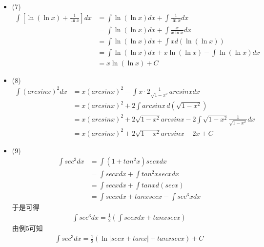 \documentclass{article}
\begin{document}
\begin{itemize}
  \item (7)
        \begin{align*}
          \int \left[ \ln(\ln x) + \frac{1}{\ln x} \right] dx
           & = \int \ln(\ln x) dx + \int \frac{1}{\ln x} dx           \\
           & = \int \ln(\ln x) dx + \int \frac{x}{x \ln x} dx         \\
           & = \int \ln(\ln x) dx + \int x d(\ln(\ln x))              \\
           & = \int \ln(\ln x) dx + x \ln(\ln x) - \int \ln(\ln x) dx \\
           & = x \ln(\ln x) + C
        \end{align*}

  \item (8)
        \begin{align*}
          \int (arcsin x)^2 dx
           & = x (arcsin x)^2 - \int x \cdot 2 \frac{1}{\sqrt{1 - x^2}} arcsin x dx                           \\
           & = x (arcsin x)^2 + 2 \int arcsin x \, d(\sqrt{1 - x^2})                                          \\
           & = x (arcsin x)^2 + 2 \sqrt{1 - x^2} arcsin x - 2 \int \sqrt{1 - x^2} \frac{1}{\sqrt{1 - x^2}} dx \\
           & = x (arcsin x)^2 + 2 \sqrt{1 - x^2} arcsin x - 2x + C
        \end{align*}

  \item (9)
        \begin{align*}
          \int sec^3  dx
           & = \int (1 + tan^2 x) sec x dx                    \\
           & = \int  sec x dx + \int tan^2 x sec x dx         \\
           & = \int  sec x dx + \int tanx d(sec x)            \\
           & = \int  sec x dx + tan x sec x - \int sec^3 x dx
        \end{align*}
        于是可得
        \begin{align*}
          \int sec^3  dx = \frac{1}{2} \left( \int  sec x dx + tan x sec x \right)
        \end{align*}
        由例5可知
        \begin{align*}
          \int sec^3  dx = \frac{1}{2} \left( \ln |sec x + tan x| + tan x sec x \right) + C
        \end{align*}


\end{itemize}
\end{document}
